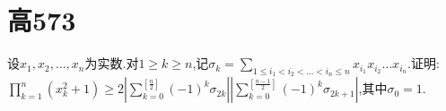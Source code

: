 \documentclass[question]{article}
\title{}
\author{}
\date{}
\begin{document}
\maketitle
\section{高573}{
设$x_1,x_2,…,x_n$为实数.对$\displaystyle 1\geq k\geq n$,记$\sigma_k=\sum\limits_{1\leq i_1<i_2<…<i_n\leq n}{x_i_1 x_i_2 …x_i_n}$.证明:$\displaystyle \prod\limits_{k=1}^n(x_k^2+1)\geq 2\left| \sum\limits_{k=0}^{\left[ \frac{n}{2}\right]}(-1)^k\sigma_{2k} \right|\left| \sum\limits_{k=0}^{\left[ \frac{n-1}{2}\right]}(-1)^k\sigma_{2k+1} \right|$,其中$\sigma_0=1$.
}
\end{document}
